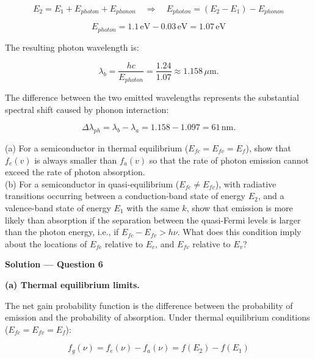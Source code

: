 \begin{equation*}
  E_2 = E_1 + E_{photon} + E_{phonon} \quad\Longrightarrow\quad E_{photon} = (E_2 - E_1) - E_{phonon}
\end{equation*}

\begin{equation*}
  E_{photon} = 1.1\,\text{eV} - 0.03\,\text{eV} = 1.07\,\text{eV}
\end{equation*}

The resulting photon wavelength is:

\begin{equation*}
  \boxed{\lambda_b = \frac{hc}{E_{photon}} = \frac{1.24}{1.07} \approx 1.158\,\mu\text{m}.}
\end{equation*}

The difference between the two emitted wavelengths represents the substantial spectral shift caused by phonon interaction:

\begin{equation*}
  \boxed{\Delta\lambda_{ph} = \lambda_b - \lambda_a = 1.158 - 1.097 = 61\,\text{nm}.}
\end{equation*}

\begin{question}[Question 6]
(a) For a semiconductor in thermal equilibrium ($E_{fc} = E_{fv} = E_f$), show that $f_e(v)$ is always smaller than $f_a(v)$ so that the rate of photon emission cannot exceed the rate of photon absorption.\\
(b) For a semiconductor in quasi-equilibrium ($E_{fc} \neq E_{fv}$), with radiative transitions occurring between a conduction-band state of energy $E_2$, and a valence-band state of energy $E_1$ with the same $k$, show that emission is more likely than absorption if the separation between the quasi-Fermi levels is larger than the photon energy, i.e., if $E_{fc} - E_{fv} > h\nu$. What does this condition imply about the locations of $E_{fc}$ relative to $E_c$, and $E_{fv}$ relative to $E_v$?
\end{question}

\textbf{\large Solution --- Question 6}

\textbf{(a) Thermal equilibrium limits.}

The net gain probability function is the difference between the probability of emission and the probability of absorption. Under thermal equilibrium conditions ($E_{fc} = E_{fv} = E_f$):

\begin{equation*}
  f_g(\nu) = f_e(\nu) - f_a(\nu) = f(E_2) - f(E_1)
\end{equation*}

